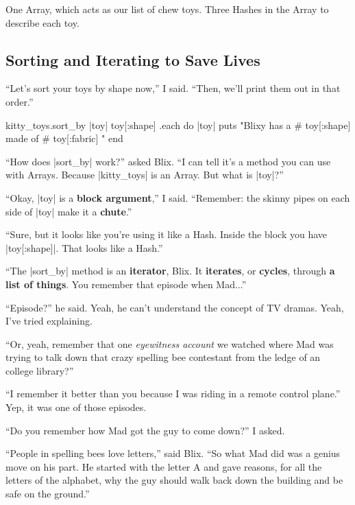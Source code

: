 \documentclass[12pt,twoside]{report}
\begin{document}
One Array, which acts as our list of chew toys.  Three Hashes in the
Array to describe each toy.



\subsection{Sorting and Iterating to Save Lives}



``Let's sort your toys by shape now,'' I said.  ``Then, we'll print
them out in that order.''


\begin{rubycode}

 kitty_toys.sort_by { |toy| toy[:shape] }.each do |toy| 
   puts "Blixy has a #{ toy[:shape] } made of #{ toy[:fabric] }"
 end

\end{rubycode}


``How does \rubyinline|sort_by| work?'' asked Blix.
``I can tell it's a method you can use with Arrays.  Because
\rubyinline|kitty_toys| is an Array.  But what is
\rubyinline|toy|?''

``Okay, \rubyinline|toy| is a {\bf block argument},''
I said.  ``Remember: the skinny pipes on each side of
\rubyinline|toy| make it a {\bf chute}.''

``Sure, but it looks like you're using it like a Hash.  Inside the
block you have \rubyinline|toy[:shape]|. That looks
like a Hash.''

``The \rubyinline|sort_by| method is an {\bf
  iterator}, Blix.  It {\bf iterates}, or {\bf cycles}, through {\bf a
  list of things}.  You remember that episode when Mad...''

``Episode?'' he said.  Yeah, he can't understand the concept of TV
dramas.  Yeah, I've tried explaining.

``Or, yeah, remember that one {\em eyewitness account} we watched
where Mad was trying to talk down that crazy spelling bee contestant
from the ledge of an college library?''

``I remember it better than you because I was riding in a remote
control plane.''  Yep, it was one of those episodes.

``Do you remember how Mad got the guy to come down?'' I asked.

``People in spelling bees love letters,'' said Blix.  ``So what Mad
did was a genius move on his part. He started with the letter A and
gave reasons, for all the letters of the alphabet, why the guy should
walk back down the building and be safe on the ground.''
\end{document}
